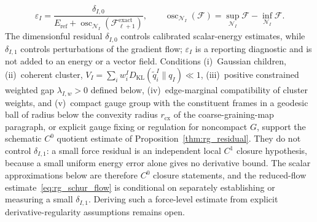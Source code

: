 \documentclass[11pt]{article}
\begin{document}
\begin{equation}
\varepsilon_I=\frac{\delta_{I,0}}{E_{\mathrm{ref}}+\operatorname{osc}_{\mathcal{N}_I}(\mathcal{F}^{\mathrm{exact}}_{\ell+1})}, \qquad
\operatorname{osc}_{\mathcal{N}_I}(\mathcal{F})=\sup_{\mathcal{N}_I}\mathcal{F}-\inf_{\mathcal{N}_I}\mathcal{F}.
\label{eq:rg_closure_dimensionless}
\end{equation}
The dimensionful residual $\delta_{I,0}$ controls calibrated scalar-energy estimates, while $\delta_{I,1}$ controls perturbations of the gradient flow; $\varepsilon_I$ is a reporting diagnostic and is not added to an energy or a vector field. Conditions (i)~Gaussian children, (ii)~coherent cluster, $V_I = \sum_i w_i^I D_{\mathrm{KL}}(\widetilde{q}_i^I \| q_I) \ll 1$, (iii)~positive constrained weighted gap $\lambda_{I,w} > 0$ defined below, (iv)~edge-marginal compatibility of cluster weights, and (v)~compact gauge group with the constituent frames in a geodesic ball of radius below the convexity radius $r_{\mathrm{cx}}$ of the coarse-graining-map paragraph, or explicit gauge fixing or regulation for noncompact $G$, support the schematic $C^0$ quotient estimate of Proposition~\ref{thm:rg_residual}. They do not control $\delta_{I,1}$: a small force residual is an independent local $C^1$ closure hypothesis, because a small uniform energy error alone gives no derivative bound. The scalar approximations below are therefore $C^0$ closure statements, and the reduced-flow estimate~\eqref{eq:rg_schur_flow} is conditional on separately establishing or measuring a small $\delta_{I,1}$. Deriving such a force-level estimate from explicit derivative-regularity assumptions remains open.
\end{document}
